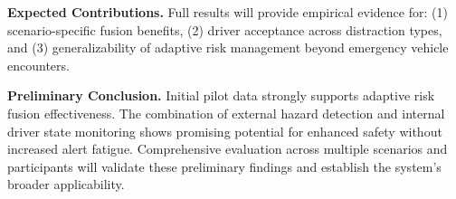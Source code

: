 \textbf{Expected Contributions.}
Full results will provide empirical evidence for: (1) scenario-specific fusion
benefits, (2) driver acceptance across distraction types, and (3) generalizability
of adaptive risk management beyond emergency vehicle encounters.

\textbf{Preliminary Conclusion.}
Initial pilot data strongly supports adaptive risk fusion effectiveness.
The combination of external hazard detection and internal driver state monitoring
shows promising potential for enhanced safety without increased alert fatigue.
Comprehensive evaluation across multiple scenarios and participants will
validate these preliminary findings and establish the system's broader applicability. 